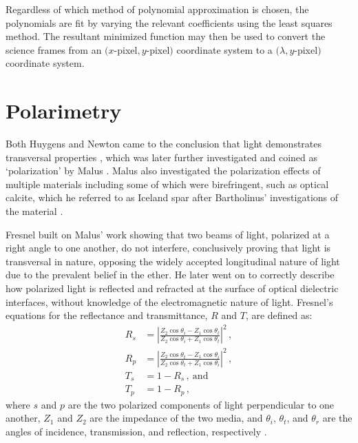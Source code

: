 Regardless of which method of polynomial approximation is chosen, the polynomials are fit by varying the relevant coefficients using the least squares method. The resultant minimized function may then be used to convert the science frames from an $(x$-pixel$, y$-pixel$)$ coordinate system to a $(\lambda, y$-pixel$)$ coordinate system.


\section{Polarimetry} \label{sec:polarimetry}

Both Huygens and Newton came to the conclusion that light demonstrates transversal properties \citep{Huygens, opticks}, which was later further investigated and coined as `polarization' by Malus \citep{Pol_Malus}. Malus also investigated the polarization effects of multiple materials including some of which were birefringent, such as optical calcite, which he referred to as Iceland spar after Bartholinus' investigations of the material \citep{Bartholinus}.


Fresnel built on Malus' work showing that two beams of light, polarized at a right angle to one another, do not interfere, conclusively proving that light is transversal in nature, opposing the widely accepted longitudinal nature of light due to the prevalent belief in the ether. He later went on to correctly describe how polarized light is reflected and refracted at the surface of optical dielectric interfaces, without knowledge of the electromagnetic nature of light. Fresnel's equations for the reflectance and transmittance, $R$ and $T$, are defined as:
\begin{equation} \label{eq:Fresnel}
    \begin{aligned}
        R_{s} &= \left\lvert \frac{Z_{2} \cos{\theta_{i}} - Z_{1} \cos{\theta_{t}}}{Z_{2} \cos{\theta_{i}} + Z_{1} \cos{\theta_{t}}} \right\rvert^{2}\,,\\
        R_{p} &= \left\lvert \frac{Z_{2} \cos{\theta_{t}} - Z_{1} \cos{\theta_{i}}}{Z_{2} \cos{\theta_{t}} + Z_{1} \cos{\theta_{i}}} \right\rvert^{2}\,,\\
        T_{s} &= 1 - R_{s}\,,\ \text{and}\\
        T_{p} &= 1 - R_{p}\,,
    \end{aligned}
\end{equation}
where $s$ and $p$ are the two polarized components of light perpendicular to one another, $Z_{1}$ and $Z_{2}$ are the impedance of the two media, and $\theta_{i}$, $\theta_{t}$, and $\theta_{r}$ are the angles of incidence, transmission, and reflection, respectively \citep{Fresnel}.

